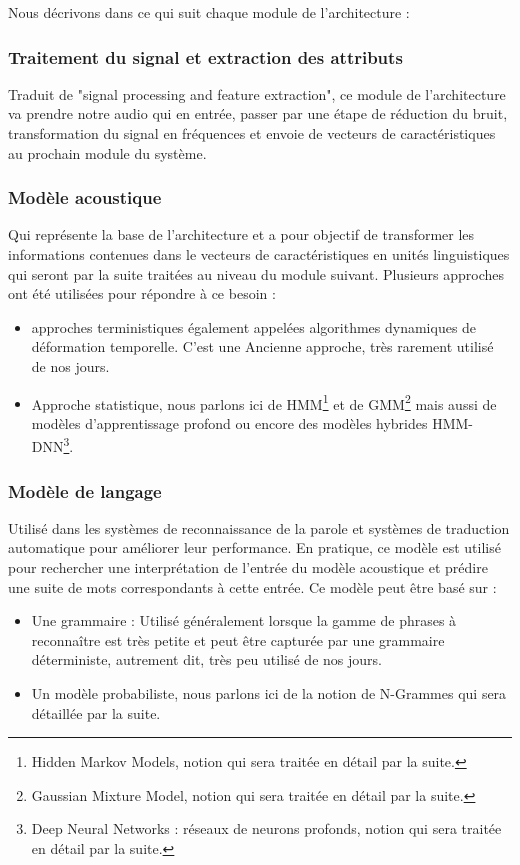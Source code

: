 Nous décrivons dans ce qui suit chaque module de l'architecture :
\newpage
\subsubsection{Traitement du signal et extraction des attributs}
Traduit de "signal processing and feature extraction", ce module de l’architecture va prendre notre audio qui en entrée, passer par une étape de réduction du bruit, transformation du signal en fréquences et envoie de vecteurs de caractéristiques au prochain module du système.

\subsubsection{Modèle acoustique}
Qui représente la base de l'architecture et a pour objectif de transformer les informations contenues dans le vecteurs de caractéristiques en unités linguistiques qui seront par la suite traitées au niveau du module suivant. Plusieurs approches ont été utilisées pour répondre à ce besoin :\cite{featureextract}
\begin{itemize}
    \item approches terministiques également appelées algorithmes dynamiques de déformation temporelle. C’est une Ancienne approche, très rarement utilisé de nos jours. \cite{terministicapproach}
    \item Approche statistique, nous parlons ici de HMM\footnote{Hidden Markov Models, notion qui sera traitée en détail par la suite.} et de GMM\footnote{Gaussian Mixture Model, notion qui sera traitée en détail par la suite.} mais aussi de modèles d’apprentissage profond ou encore des modèles hybrides HMM-DNN\footnote{Deep Neural Networks : réseaux de neurons profonds, notion qui sera traitée en détail par la suite.}.	 
\end{itemize}

\subsubsection{Modèle de langage}
Utilisé dans les systèmes de reconnaissance de la parole et systèmes de traduction automatique pour améliorer leur performance. En pratique, ce modèle est utilisé pour rechercher une interprétation de l'entrée du modèle acoustique et prédire une suite de mots correspondants à cette entrée. Ce modèle peut être basé sur :\cite{languagemodel}
\\
\begin{itemize}
    \item Une grammaire : Utilisé généralement lorsque la gamme de phrases à reconnaître est très petite et peut être capturée par une grammaire déterministe, autrement dit, très peu utilisé de nos jours. 
    \item Un modèle probabiliste, nous parlons ici de la notion de N-Grammes qui sera détaillée par la suite. 
\end{itemize}


